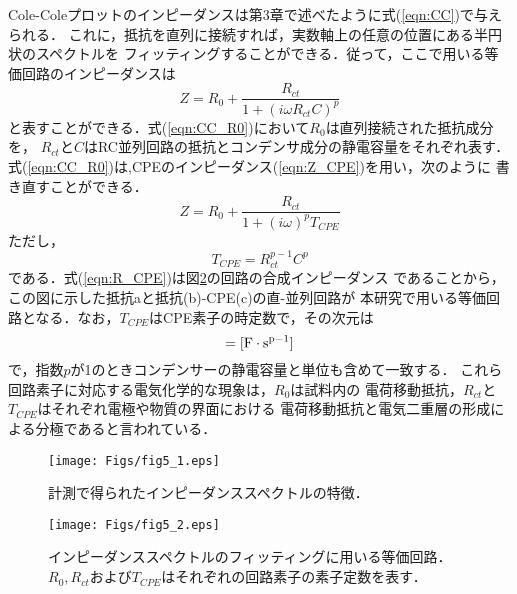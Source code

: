 Cole-Coleプロットのインピーダンスは第3章で述べたように式(\ref{eqn:CC})で与えられる．
これに，抵抗を直列に接続すれば，実数軸上の任意の位置にある半円状のスペクトルを
フィッティングすることができる．従って，ここで用いる等価回路のインピーダンスは
\begin{equation}
	Z=R_0 +\frac{R_{ct}}{1+\left( i\omega R_{ct}C\right)^p}
	\label{eqn:CC_R0}
\end{equation}
と表すことができる．式(\ref{eqn:CC_R0})において$R_0$は直列接続された抵抗成分を，
$R_{ct}$と$C$はRC並列回路の抵抗とコンデンサ成分の静電容量をそれぞれ表す．
式(\ref{eqn:CC_R0})は,CPEのインピーダンス(\ref{eqn:Z_CPE})を用い，次のように
書き直すことができる．
\begin{equation}
	Z=R_0 +\frac{R_{ct}}{1+\left( i\omega \right)^pT_{CPE}}
	\label{eqn:R_CPE}
\end{equation}
ただし，
\begin{equation}
	T_{CPE}=R_{ct}^{p-1}C^{p}
	\label{eqn:T_CPE}
\end{equation}
である．式(\ref{eqn:R_CPE})は図\ref{fig:fig5_2}の回路の合成インピーダンス
であることから，この図に示した抵抗aと抵抗(b)-CPE(c)の直-並列回路が
本研究で用いる等価回路となる．なお，$T_{CPE}$はCPE素子の時定数で，その次元は
\begin{equation}
	[T_{CPE}] ={\rm [ F\cdot s^{p-1}]}
	\label{eqn:}
\end{equation}
で，指数$p$が1のときコンデンサーの静電容量と単位も含めて一致する．
これら回路素子に対応する電気化学的な現象は，$R_0$は試料内の
電荷移動抵抗，$R_{ct}$と$T_{CPE}$はそれぞれ電極や物質の界面における
電荷移動抵抗と電気二重層の形成による分極であると言われている．
\begin{figure}[h]
	\begin{center}
	\texttt{[image: Figs/fig5\_1.eps]} 
	\end{center}
	\caption{
		計測で得られたインピーダンススペクトルの特徴．	
	} 
	\label{fig:fig5_1}
\end{figure}
\begin{figure}[h]
	\begin{center}
	\texttt{[image: Figs/fig5\_2.eps]} 
	\end{center}
	\caption{
		インピーダンススペクトルのフィッティングに用いる等価回路．
		$R_0,R_{ct}$および$T_{CPE}$はそれぞれの回路素子の素子定数を表す．
	} 
	\label{fig:fig5_2}
\end{figure}
